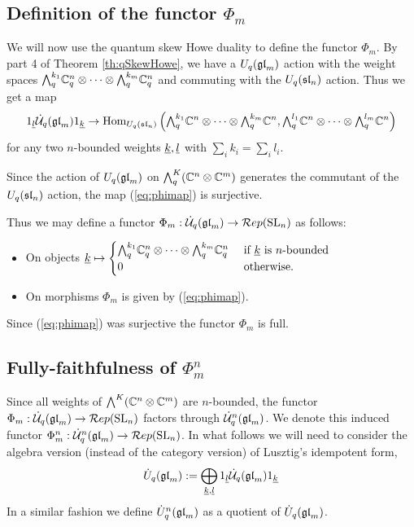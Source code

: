 \documentclass[11pt]{amsart}
\begin{document}
\subsection{Definition of the functor \texorpdfstring{$\Phi_m$}{Phi}}

We will now use the quantum skew Howe duality to define the functor $\Phi_m$. By part 4 of Theorem \ref{th:qSkewHowe}, we have a $U_q(\gl_m)$ action with the weight spaces $\Alt{k_1}{q} \mathbb C_q^n \otimes \cdots \otimes \Alt{k_m}{q} \mathbb C_q^n$ and commuting with the $U_q(\sl_n)$ action. Thus we get a map
\begin{equation}\label{eq:phimap}
\one_\ul{l} \dU(\gl_m) \one_\ul{k} \rightarrow \Hom_{U_q(\sl_n)} \left(\Alt{k_1}{q} \mathbb C^n \otimes \cdots \otimes \Alt{k_m}{q} \mathbb C^n, \Alt{l_1}{q} \mathbb C^n \otimes \cdots \otimes \Alt{l_m}{q} \mathbb C^n\right)
\end{equation}
for any two $n$-bounded weights $\ul{k}, \ul{l}$ with $\sum_i k_i = \sum_i l_i $.

Since the action of $U_q(\gl_m)$  on $\Alt{K}{q}(\mathbb C^n \otimes \mathbb C^m) $ generates the commutant of the $U_q(\sl_n)$ action, the map (\ref{eq:phimap}) is surjective.

Thus we may define a functor $\Phi_m: \dU(\gl_m) \rightarrow \Rep(\SL_n)$ as follows:
\begin{itemize}
\item On objects
$\ul{k} \mapsto
\begin{cases}
\Alt{k_1}{q} \mathbb C_q^n \otimes \cdots \otimes \Alt{k_m}{q} \mathbb C_q^n & \text{ if } \ul{k} \text{ is } n\text{-bounded } \\
0 & \text{ otherwise.}
\end{cases}$
\item On morphisms $ \Phi_m $ is given by (\ref{eq:phimap}).
\end{itemize}
Since (\ref{eq:phimap}) was surjective the functor $\Phi_m$ is full.

\subsection{Fully-faithfulness of \texorpdfstring{$ \Phi_m^n$}{Phi}}
\label{sec:fully-faithful}

Since all weights of $\Alt{K}{}(\mathbb{C}^n \otimes \mathbb{C}^m)$ are $ n$-bounded, the functor $\Phi_m: \dU(\gl_m)\rightarrow \Rep(\SL_n)$ factors through $\dU^n(\gl_m)$. We denote this induced functor $\Phi_m^n: \dU^n(\gl_m) \rightarrow \Rep(\SL_n)$. In what follows we will need to consider the algebra version (instead of the category version) of Lusztig's idempotent form,
$$
\dalg(\gl_m) := \bigoplus_{\ul{k}, \ul{l}} \one_{\ul{l}} \dU(\gl_m) \one_{\ul{k}}
$$
In a similar fashion we define $\dalg^n(\gl_m)$ as a quotient of $\dalg(\gl_m)$. 
\end{document}
